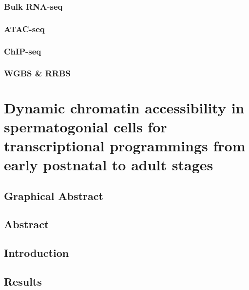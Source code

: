 \documentclass[12pt,twoside]{reedthesis}
\begin{document}
\hypertarget{bulk-rna-seq}{%
\subsection{Bulk RNA-seq}\label{bulk-rna-seq}}

\hypertarget{atac-seq}{%
\subsection{ATAC-seq}\label{atac-seq}}

\hypertarget{chip-seq}{%
\subsection{ChIP-seq}\label{chip-seq}}

\hypertarget{wgbs-rrbs}{%
\subsection{WGBS \& RRBS}\label{wgbs-rrbs}}

\hypertarget{developmental}{%
\chapter{Dynamic chromatin accessibility in spermatogonial cells for transcriptional programmings from early postnatal to adult stages}\label{developmental}}

\newpage

\hypertarget{graphical-abstract}{%
\section{Graphical Abstract}\label{graphical-abstract}}

\newpage

\hypertarget{abstract-1}{%
\section{Abstract}\label{abstract-1}}

\newpage

\hypertarget{introduction}{%
\section{Introduction}\label{introduction}}

\newpage

\hypertarget{results}{%
\section{Results}\label{results}}
\end{document}
